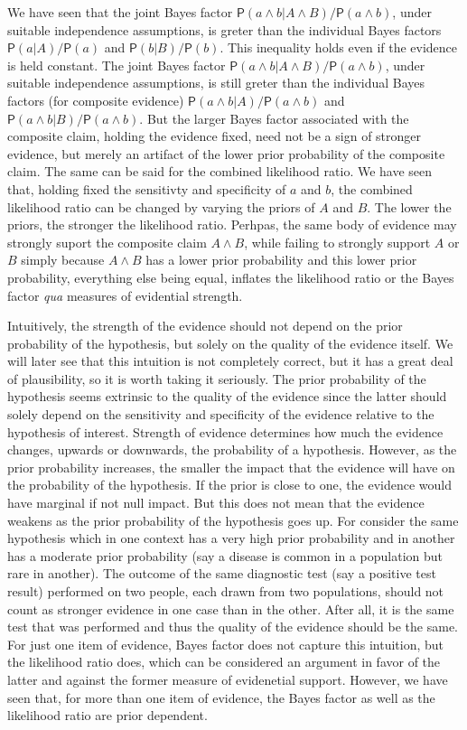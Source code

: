 \documentclass[
  10pt,
  dvipsnames,enabledeprecatedfontcommands]{scrartcl}
\newcommand{\pr}[1]{\mathsf{P}(#1)}
\begin{document}
We have seen that the joint Bayes factor
\(\pr{a \wedge b\vert A\wedge B}/\pr{a \wedge b}\), under suitable
independence assumptions, is greter than the individual Bayes factors
\(\pr{a \vert A}/\pr{a}\) and \(\pr{b|B}/\pr{b}\). This inequality holds
even if the evidence is held constant. The joint Bayes factor
\(\pr{a \wedge b\vert A\wedge B}/\pr{a \wedge b}\), under suitable
independence assumptions, is still greter than the individual Bayes
factors (for composite evidence)
\(\pr{a \wedge b \vert A}/\pr{a\wedge b}\) and
\(\pr{a\wedge b|B}/\pr{a\wedge b}\). But the larger Bayes factor
associated with the composite claim, holding the evidence fixed, need
not be a sign of stronger evidence, but merely an artifact of the lower
prior probability of the composite claim. The same can be said for the
combined likelihood ratio. We have seen that, holding fixed the
sensitivty and specificity of \(a\) and \(b\), the combined likelihood
ratio can be changed by varying the priors of \(A\) and \(B\). The lower
the priors, the stronger the likelihood ratio. Perhpas, the same body of
evidence may strongly suport the composite claim \(A\wedge B\), while
failing to strongly support \(A\) or \(B\) simply because \(A\wedge B\)
has a lower prior probability and this lower prior probability,
everything else being equal, inflates the likelihood ratio or the Bayes
factor \textit{qua} measures of evidential strength.

Intuitively, the strength of the evidence should not depend on the prior
probability of the hypothesis, but solely on the quality of the evidence
itself. We will later see that this intuition is not completely correct,
but it has a great deal of plausibility, so it is worth taking it
seriously. The prior probability of the hypothesis seems extrinsic to
the quality of the evidence since the latter should solely depend on the
sensitivity and specificity of the evidence relative to the hypothesis
of interest. Strength of evidence determines how much the evidence
changes, upwards or downwards, the probability of a hypothesis. However,
as the prior probability increases, the smaller the impact that the
evidence will have on the probability of the hypothesis. If the prior is
close to one, the evidence would have marginal if not null impact. But
this does not mean that the evidence weakens as the prior probability of
the hypothesis goes up. For consider the same hypothesis which in one
context has a very high prior probability and in another has a moderate
prior probability (say a disease is common in a population but rare in
another). The outcome of the same diagnostic test (say a positive test
result) performed on two people, each drawn from two populations, should
not count as stronger evidence in one case than in the other. After all,
it is the same test that was performed and thus the quality of the
evidence should be the same. For just one item of evidence, Bayes factor
does not capture this intuition, but the likelihood ratio does, which
can be considered an argument in favor of the latter and against the
former measure of evidenetial support. However, we have seen that, for
more than one item of evidence, the Bayes factor as well as the
likelihood ratio are prior dependent.
\end{document}
